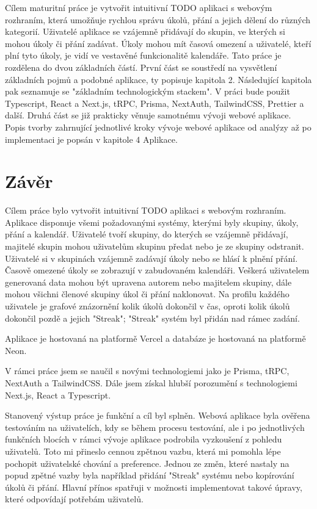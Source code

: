 \documentclass[a4paper,12pt]{report}
\begin{document}
Cílem maturitní práce je vytvořit intuitivní TODO aplikaci s webovým rozhraním, která umožňuje rychlou správu úkolů, přání a jejich dělení do různých kategorií. Uživatelé aplikace se vzájemně přidávají do skupin, ve kterých si mohou úkoly či přání zadávat. Úkoly mohou mít časová omezení a uživatelé, kteří plní tyto úkoly, je vidí ve vestavěné funkcionalitě kalendáře.
\newline
Tato práce je rozdělena do dvou základních částí. První část se soustředí na vysvětlení základních pojmů a podobné aplikace, ty popisuje kapitola 2. Následující kapitola pak seznamuje se "základním technologickým stackem". V práci bude použit Typescript, React a Next.js, tRPC, Prisma, NextAuth, TailwindCSS, Prettier a další.
\newline
Druhá část se již prakticky věnuje samotnému vývoji webové aplikace. Popis tvorby zahrnující jednotlivé kroky vývoje webové aplikace od analýzy až po implementaci je popsán v kapitole 4 Aplikace.
\newline




\chapter{Závěr}
Cílem práce bylo vytvořit intuitivní TODO aplikaci s webovým rozhraním. Aplikace disponuje všemi požadovanými systémy, kterými byly skupiny, úkoly, přání a kalendář. Uživatelé tvoří skupiny, do kterých se vzájemně přidávají, majitelé skupin mohou uživatelům skupinu předat nebo je ze skupiny odstranit. Uživatelé si v skupinách vzájemně zadávají úkoly nebo se hlásí k plnění přání. Časově omezené úkoly se zobrazují v zabudovaném kalendáři. Veškerá uživatelem generovaná data mohou být upravena autorem nebo majitelem skupiny, dále mohou všichni členové skupiny úkol či přání naklonovat. Na profilu každého uživatele je grafové znázornění kolik úkolů dokončil v čas, oproti kolik úkolů dokončil pozdě a jejich "Streak"; "Streak" systém byl přidán nad rámec zadání.

Aplikace je hostovaná na platformě Vercel\cite{vercel} a databáze je hostovaná na platformě Neon\cite{neon}.

V rámci práce jsem se naučil s novými technologiemi jako je Prisma, tRPC, NextAuth a TailwindCSS. Dále jsem získal hlubší porozumění s technologiemi Next.js, React a Typescript.

Stanovený výstup práce je funkční a cíl byl splněn. Webová aplikace byla ověřena testováním na uživatelích, kdy se během procesu testování, ale i po jednotlivých funkčních blocích v rámci vývoje aplikace podrobila vyzkoušení z pohledu uživatelů. Toto mi přineslo cennou zpětnou vazbu, která mi pomohla lépe pochopit uživatelské chování a preference. Jednou ze změn, které nastaly na popud zpětné vazby byla například přidání "Streak" systému nebo kopírování úkolů či přání. Hlavní přínos spatřuji v možnosti implementovat takové úpravy, které odpovídají potřebám uživatelů. 
\end{document}
